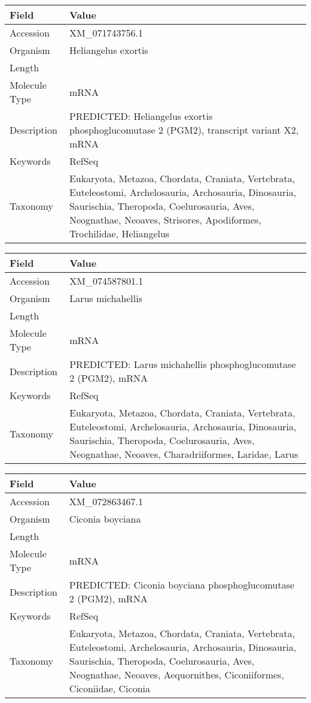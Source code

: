 \documentclass[10pt]{article}
\begin{document}
\vspace{1em}
{\footnotesize
\begin{longtable}{>{\raggedright\arraybackslash}p{4.5cm} >{\raggedright\arraybackslash}p{11.5cm}}
\textbf{Field} & \textbf{Value} \\
\hline
Accession & XM\_071743756.1 \\
Organism & Heliangelus exortis \\
Length & 6544 \\
Molecule Type & mRNA \\
Description & PREDICTED: Heliangelus exortis phosphoglucomutase 2 (PGM2), transcript variant X2, mRNA \\
Keywords & RefSeq \\
Taxonomy & Eukaryota, Metazoa, Chordata, Craniata, Vertebrata, Euteleostomi, Archelosauria, Archosauria, Dinosauria, Saurischia, Theropoda, Coelurosauria, Aves, Neognathae, Neoaves, Strisores, Apodiformes, Trochilidae, Heliangelus \\
\end{longtable}
}

\vspace{1em}
{\footnotesize
\begin{longtable}{>{\raggedright\arraybackslash}p{4.5cm} >{\raggedright\arraybackslash}p{11.5cm}}
\textbf{Field} & \textbf{Value} \\
\hline
Accession & XM\_074587801.1 \\
Organism & Larus michahellis \\
Length & 2223 \\
Molecule Type & mRNA \\
Description & PREDICTED: Larus michahellis phosphoglucomutase 2 (PGM2), mRNA \\
Keywords & RefSeq \\
Taxonomy & Eukaryota, Metazoa, Chordata, Craniata, Vertebrata, Euteleostomi, Archelosauria, Archosauria, Dinosauria, Saurischia, Theropoda, Coelurosauria, Aves, Neognathae, Neoaves, Charadriiformes, Laridae, Larus \\
\end{longtable}
}

\vspace{1em}
{\footnotesize
\begin{longtable}{>{\raggedright\arraybackslash}p{4.5cm} >{\raggedright\arraybackslash}p{11.5cm}}
\textbf{Field} & \textbf{Value} \\
\hline
Accession & XM\_072863467.1 \\
Organism & Ciconia boyciana \\
Length & 4032 \\
Molecule Type & mRNA \\
Description & PREDICTED: Ciconia boyciana phosphoglucomutase 2 (PGM2), mRNA \\
Keywords & RefSeq \\
Taxonomy & Eukaryota, Metazoa, Chordata, Craniata, Vertebrata, Euteleostomi, Archelosauria, Archosauria, Dinosauria, Saurischia, Theropoda, Coelurosauria, Aves, Neognathae, Neoaves, Aequornithes, Ciconiiformes, Ciconiidae, Ciconia \\
\end{longtable}
}
\end{document}
